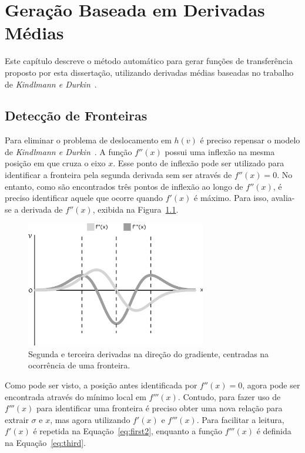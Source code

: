 
\chapter{Geração Baseada em Derivadas Médias}
\label{ch:my}
	Este capítulo descreve o método automático para gerar funções de transferência proposto por esta dissertação, utilizando derivadas médias baseadas no trabalho de \textit{Kindlmann e Durkin}~\cite{gordon}.

\section{Detecção de Fronteiras}
\label{sec:my.deriv}
	Para eliminar o problema de deslocamento em $ h(v) $ é preciso repensar o modelo de \textit{Kindlmann e Durkin}~\cite{gordon}. A função $ f''(x) $ possui uma inflexão na mesma posição em que cruza o eixo $ x $. Esse ponto de inflexão pode ser utilizado para identificar a fronteira pela segunda derivada sem ser através de $ f''(x) = 0 $. No entanto, como são encontrados três pontos de inflexão ao longo de $ f''(x) $, é preciso identificar aquele que ocorre quando $ f'(x) $ é máximo. Para isso, avalia-se a derivada de $ f''(x) $, exibida na Figura~\ref{fig:m_inflection}.
	
\begin{figure}[h]
	\centering
	\includegraphics[width=0.7\textwidth]{images/m_inflection}
	\caption{Segunda e terceira derivadas na direção do gradiente, centradas na ocorrência de uma fronteira.}
	\label{fig:m_inflection}
\end{figure}

	Como pode ser visto, a posição antes identificada por $ f''(x) = 0 $, agora pode ser encontrada através do mínimo local em $ f'''(x) $. Contudo, para fazer uso de $ f'''(x) $ para identificar uma fronteira é preciso obter uma nova relação para extrair $ \sigma $ e $ x $, mas agora utilizando $ f'(x) $ e $ f'''(x) $. Para facilitar a leitura, $ f'(x) $ é repetida na Equação~\eqref{eq:first2}, enquanto a função $ f'''(x) $ é definida na Equação~\eqref{eq:third}.
	
